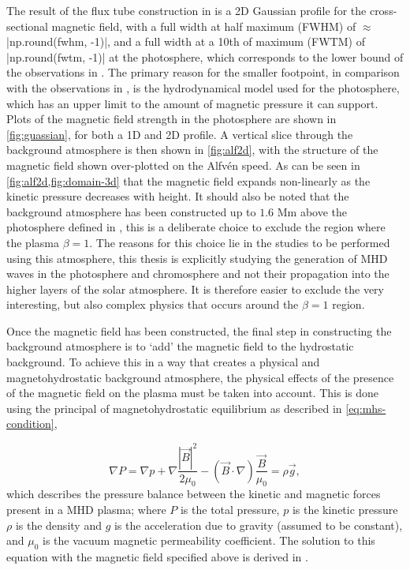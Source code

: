 The result of the flux tube construction in \cite{gent2013, gent2014} is a 2D Gaussian profile for the cross-sectional magnetic field, with a full width at half maximum (FWHM) of $\approx$ \py[chapter3]|np.round(fwhm, -1)|, and a full width at a 10th of maximum (FWTM) of \py[chapter3]|np.round(fwtm, -1)| at the photosphere, which corresponds to the lower bound of the observations in \cite{utz2013}.
The primary reason for the smaller footpoint, in comparison with the observations in \cite{utz2013}, is the hydrodynamical model used for the photosphere, which has an upper limit to the amount of magnetic pressure it can support.
Plots of the magnetic field strength in the photosphere are shown in \cref{fig:guassian}, for both a 1D and 2D profile.
A vertical slice through the background atmosphere is then shown in \cref{fig:alf2d}, with the structure of the magnetic field shown over-plotted on the Alfv\'en speed.
As can be seen in \cref{fig:alf2d,fig:domain-3d} that the magnetic field expands non-linearly as the kinetic pressure decreases with height.
It should also be noted that the background atmosphere has been constructed up to $1.6$ Mm above the photosphere defined in \cite{vernazza1981}, this is a deliberate choice to exclude the region where the plasma $\beta = 1$.
The reasons for this choice lie in the studies to be performed using this atmosphere, this thesis is explicitly studying the generation of MHD waves in the photosphere and chromosphere and not their propagation into the higher layers of the solar atmosphere.
It is therefore easier to exclude the very interesting, but also complex physics that occurs around the $\beta = 1$ region.

Once the magnetic field has been constructed, the final step in constructing the background atmosphere is to `add' the magnetic field to the hydrostatic background.
To achieve this in a way that creates a physical and magnetohydrostatic background atmosphere, the physical effects of the presence of the magnetic field on the plasma must be taken into account.
This is done using the principal of magnetohydrostatic equilibrium as described in \cref{eq:mhs-condition},

\begin{equation}
\nabla P = 
\nabla p + \nabla \frac{|\vec{B}|^2}{2\mu_0} - (\vec{B}\cdot\nabla)
{\frac{\vec{B}}{\mu_0} }
= \rho \vec{g}, 
\label{eq:mhs-condition}
\end{equation}
which describes the pressure balance between the kinetic and magnetic forces present in a MHD plasma;
where $P$ is the total pressure, $p$ is the kinetic pressure $\rho$ is the density and $g$ is the acceleration due to gravity (assumed to be constant), and $\mu_0$ is the vacuum magnetic permeability coefficient.
The solution to this equation with the magnetic field specified above is derived in \cite{gent2013,gent2014}.


